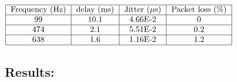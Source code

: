 \begin{center}
  $\begin{tabular}{|c|c|c|c|c|}
    \hline
    \text{Frequency (Hz)} & \text{delay (ms)} & \text{Jitter ($\mu$s)} & \text{Packet loss (\%)}\\
    \hline
    99 & 10.1 & 4.66E-2 & 0 \\
    \hline
    474 & 2.1 & 5.51E-2 & 0.2 \\
    \hline
    638 & 1.6 & 1.16E-2 & 1.2 \\
    \hline
  \end{tabular}$
\end{center}
% 	
% 	    
% 	    
% 	    
% 	    
% 	    

\subsection*{Results:}

